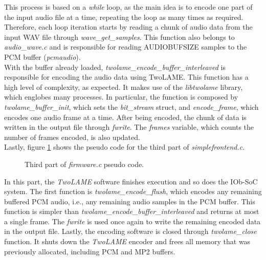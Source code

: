 This process is based on a \textit{while} loop, as the main idea is to encode one part of the input audio file at a time, repeating the loop as many times as required. Therefore, each loop iteration starts by reading a chunk of audio data from the input WAV file through \textit{wave\_get\_samples}. This function also belongs to \textit{audio\_wave.c} and is responsible for reading AUDIOBUFSIZE samples to the PCM buffer (\textit{pcmaudio}).\\
With the buffer already loaded, \textit{twolame\_encode\_buffer\_interleaved} is responsible for encoding the audio data using TwoLAME. This function has a high level of complexity, as expected. It makes use of the \textit{libtwolame} library, which englobes many processes. In particular, the function is composed by \textit{twolame\_buffer\_init}, which sets the \textit{bit\_stream} struct, and \textit{encode\_frame}, which encodes one audio frame at a time.
After being encoded, the chunk of data is written in the output file through \textit{fwrite}. The \textit{frames} variable, which counts the number of frames encoded, is also updated. \\

Lastly, figure \ref{pseudo3} shows the pseudo code for the third part of \textit{simplefrontend.c}. 

\begin{figure}[H]
\centerline{}
\caption{Third part of \textit{firmware.c} pseudo code.}
\label{pseudo3}
\end{figure}


In this part, the \textit{TwoLAME} software finishes execution and so does the IOb-SoC system.
The first function is \textit{twolame\_encode\_flush}, which encodes any remaining buffered PCM audio, i.e., any remaining audio samples in the PCM buffer. This function is simpler than \textit{twolame\_encode\_buffer\_interleaved} and returns at most a single frame.
The \textit{fwrite} is used once again to write the remaining encoded data in the output file. Lastly, the encoding software is closed through \textit{twolame\_close} function. It shuts down the \textit{TwoLAME} encoder and frees all memory that was previously allocated, including PCM and MP2 buffers.


